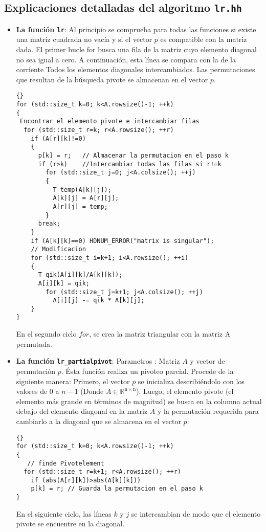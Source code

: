 \documentclass[a4paper,11pt]{article}
\theoremstyle{definition}
\begin{document}
\subsection{Explicaciones detalladas del algoritmo \lstinline{lr.hh}}
\begin{itemize}
\item \textbf{La función \lstinline{lr}}: Al principio se comprueba para todas 
las funciones si existe una matriz cuadrada no vacía y si el vector $p$ 
es compatible con la matriz dada. El primer bucle for busca una fila de
la matriz cuyo elemento diagonal no sea igual a cero. A continuación, 
esta línea se compara con la de la corriente Todos los elementos diagonales
intercambiados. Las permutaciones que resultan de la búsqueda pivote 
se almacenan en el vector $p$.

{\footnotesize{\begin{lstlisting}{}
for (std::size_t k=0; k<A.rowsize()-1; ++k)
{
 Encontrar el elemento pivote e intercambiar filas
  for (std::size_t r=k; r<A.rowsize(); ++r)
    if (A[r][k]!=0)
    {
      p[k] = r;   // Almacenar la permutacion en el paso k
      if (r>k)    //Intercambiar todas las filas si r!=k
        for (std::size_t j=0; j<A.colsize(); ++j)
        {
          T temp(A[k][j]);
          A[k][j] = A[r][j];
          A[r][j] = temp;
        }
      break;
    }
    if (A[k][k]==0) HDNUM_ERROR("matrix is singular");
    // Modificacion
    for (std::size_t i=k+1; i<A.rowsize(); ++i)
    {
      T qik(A[i][k]/A[k][k]);
      A[i][k] = qik;
        for (std::size_t j=k+1; j<A.colsize(); ++j)
          A[i][j] -= qik * A[k][j];
    }
}
\end{lstlisting}}}

  En el segundo ciclo $for$, se crea la matriz triangular con la matriz A
  permutada.

\item \textbf{La función \lstinline{lr_partialpivot}}: Parametros :
  Matriz $A$ y vector de permutación $p$.  Ésta función realiza un pivoteo parcial.
  Procede de la siguiente manera: Primero, el vector $p$ se inicializa describiéndolo
  con los valores de $0$ a $n-1$ (Donde $A \in \mathbb{R^{\mathrm{n}\times \mathrm{n}}}$).  
  Luego, el elemento pivote (el elemento más grande en términos de magnitud) se busca en la columna actual
  debajo del elemento diagonal en la matriz $A$ y la permutación requerida para cambiarlo
  a la diagonal que se almacena en el vector $p$:

{\footnotesize{\begin{lstlisting}{}
for (std::size_t k=0; k<A.rowsize()-1; ++k)
{
   // finde Pivotelement
  for (std::size_t r=k+1; r<A.rowsize(); ++r)
    if (abs(A[r][k])>abs(A[k][k]))
    p[k] = r; // Guarda la permutacion en el paso k
}
\end{lstlisting}}}
  En el siguiente ciclo, las líneas $k$ y $j$ se intercambian de modo que 
  el elemento pivote se encuentre en la diagonal.


\end{itemize}
\end{document}
